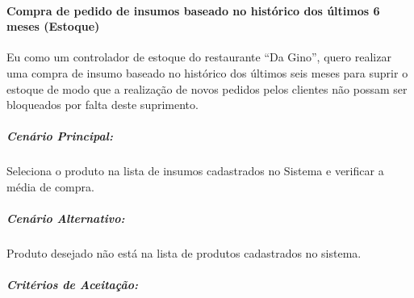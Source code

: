 \begin{itemize}
\begin{description}
\end{description}

\end{itemize}

\paragraph{Compra de pedido de insumos baseado no histórico dos últimos 6 meses (Estoque)}

Eu como um controlador de estoque do restaurante “Da Gino”, quero realizar uma compra de insumo baseado no histórico dos últimos seis meses para suprir o estoque de modo que a realização de novos pedidos pelos clientes não possam ser bloqueados por falta deste suprimento.

\subparagraph{Cenário Principal:}

Seleciona o produto na lista de insumos cadastrados no Sistema e verificar a média de compra.

\subparagraph{Cenário Alternativo:}

Produto desejado não está na lista de produtos cadastrados no sistema.

\subparagraph{Critérios de Aceitação:}


